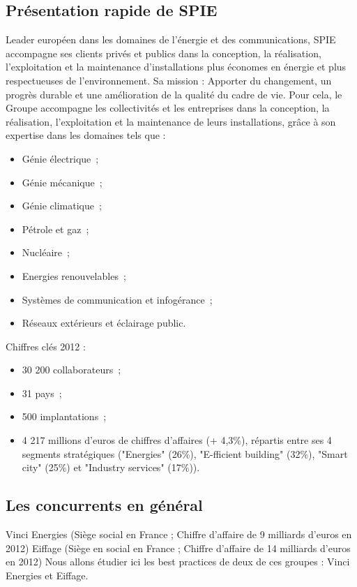     \subsection{Présentation rapide de SPIE}
    	Leader européen dans les domaines de l'énergie et des communications, SPIE accompagne ses clients privés et publics dans la conception, la réalisation, l'exploitation et la maintenance d'installations plus économes en énergie et plus respectueuses de l'environnement.
    	Sa mission : Apporter du changement, un progrès durable et une amélioration de la qualité du cadre de vie.
        \newpage
    	Pour cela, le Groupe accompagne les collectivités et les entreprises dans la conception, la réalisation, l'exploitation et la maintenance de leurs installations, grâce à son expertise dans les domaines tels que :
        \begin{itemize}
        	\item Génie électrique~;
        	\item Génie mécanique~;
        	\item Génie climatique~;
        	\item Pétrole et gaz~;
        	\item Nucléaire~;
        	\item Energies renouvelables~;
        	\item Systèmes de communication et infogérance~;
        	\item Réseaux extérieurs et éclairage public.
        \end{itemize}
        \bigbreak
        Chiffres clés 2012 :
        \begin{itemize}
        	\item 30 200 collaborateurs~;
        	\item 31 pays~;
        	\item 500 implantations~;
        	\item 4 217 millions d'euros de chiffres d'affaires (+ 4,3\%), répartis entre ses 4 segments stratégiques ("Energies" (26\%), "E-fficient building" (32\%), "Smart city" (25\%) et "Industry services" (17\%)).
        \end{itemize}


    \subsection{Les concurrents en général}
        Vinci Energies (Siège social en France ; Chiffre d'affaire de 9 milliards d’euros en 2012)
        Eiffage (Siège en social en France ; Chiffre d'affaire de 14 milliards d’euros en 2012)
        	Nous allons étudier ici les best practices de deux de ces groupes : Vinci Energies et Eiffage.

